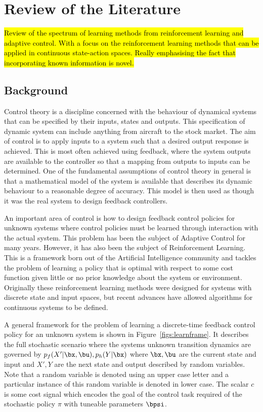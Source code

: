 \chapter{Review of the Literature}
\hl{Review of the spectrum of learning methods from reinforcement learning and adaptive control. With a focus on the reinforcement learning methods that can be applied in continuous state-action spaces. Really emphasising the fact that incorporating known information is novel.}

\section{Background}
Control theory is a discipline concerned with the behaviour of dynamical systems that can be specified by their inputs, states and outputs. This specification of dynamic system can include anything from aircraft to the stock market. The aim of control is to apply inputs to a system such that a desired output response is achieved. This is most often achieved using feedback, where the system outputs are available to the controller so that a mapping from outputs to inputs can be determined. One of the fundamental assumptions of control theory in general is that a mathematical model of the system is available that describes its dynamic behaviour to a reasonable degree of accuracy. This model is then used as though it was the real system to design feedback controllers.

An important area of control is how to design feedback control policies for unknown systems where control policies must be learned through interaction with the actual system. This problem has been the subject of Adaptive Control for many years. However, it has also been the subject of Reinforcement Learning. This is a framework born out of the Artificial Intelligence community and tackles the problem of learning a policy that is optimal with respect to some cost function given little or no prior knowledge about the system or environment. Originally these reinforcement learning methods were designed for systems with discrete state and input spaces, but recent advances have allowed algorithms for continuous systems to be defined.

A general framework for the problem of learning a discrete-time feedback control policy for an unknown system is shown in Figure~\ref{figs:learnframe}. It describes the full stochastic scenario where the systems unknown transition dynamics are governed by $p_f(X'|\bx,\bu), p_h(Y|\bx)$ where $\bx, \bu$ are the current state and input and $X', Y$ are the next state and output described by random variables. Note that a random variable is denoted using an upper case letter and a particular instance of this random variable is denoted in lower case. The scalar $c$ is some cost signal which encodes the goal of the control task required of the stochastic policy $\pi$ with tuneable parameters $\bpsi$.

